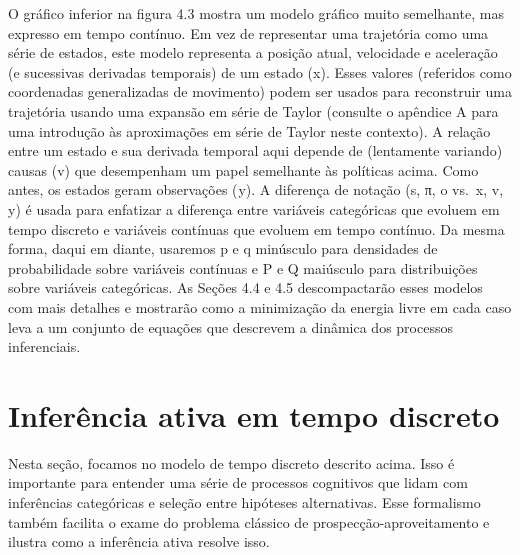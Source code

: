 \documentclass[
  12pt,
]{book}
\begin{document}
O gráfico inferior na figura 4.3 mostra um modelo gráfico muito
semelhante, mas expresso em tempo contínuo. Em vez de representar uma
trajetória como uma série de estados, este modelo representa a posição
atual, velocidade e aceleração (e sucessivas derivadas temporais) de um
estado (x). Esses valores (referidos como coordenadas generalizadas de
movimento) podem ser usados \hspace{0pt}\hspace{0pt}para reconstruir uma trajetória usando uma
expansão em série de Taylor (consulte o apêndice A para uma introdução
às aproximações em série de Taylor neste contexto). A relação entre um
estado e sua derivada temporal aqui depende de (lentamente variando)
causas (v) que desempenham um papel semelhante às políticas acima. Como
antes, os estados geram observações ( y). A diferença de notação (s, π,
o vs.~x, v, y) é usada para enfatizar a diferença entre variáveis
\hspace{0pt}\hspace{0pt}categóricas que evoluem em tempo discreto e variáveis \hspace{0pt}\hspace{0pt}contínuas que
evoluem em tempo contínuo. Da mesma forma, daqui em diante, usaremos p e
q minúsculo para densidades de probabilidade sobre variáveis \hspace{0pt}\hspace{0pt}contínuas
e P e Q maiúsculo para distribuições sobre variáveis \hspace{0pt}\hspace{0pt}categóricas. As
Seções 4.4 e 4.5 descompactarão esses modelos com mais detalhes e
mostrarão como a minimização da energia livre em cada caso leva a um
conjunto de equações que descrevem a dinâmica dos processos
inferenciais.

\hypertarget{inferuxeancia-ativa-em-tempo-discreto}{%
\section{Inferência ativa em tempo discreto}\label{inferuxeancia-ativa-em-tempo-discreto}}

Nesta seção, focamos no modelo de tempo discreto descrito acima. Isso é
importante para entender uma série de processos cognitivos que lidam com
inferências categóricas e seleção entre hipóteses alternativas. Esse
formalismo também facilita o exame do problema clássico de
prospecção-aproveitamento e ilustra como a inferência ativa resolve
isso.
\end{document}
